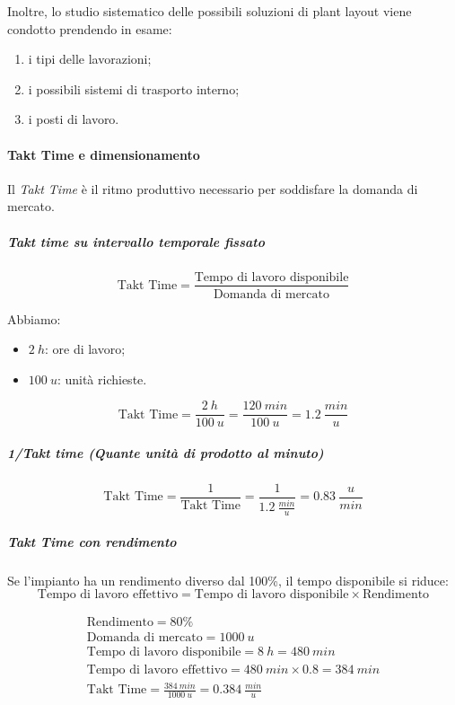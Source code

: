 Inoltre, lo studio sistematico delle possibili soluzioni di plant layout viene condotto prendendo in esame:
\begin{enumerate}
    \item i tipi delle lavorazioni;
    \item i possibili sistemi di trasporto interno;
    \item i posti di lavoro.
\end{enumerate}

%
\paragraph{Takt Time e dimensionamento} Il \emph{Takt Time} è il ritmo produttivo necessario per soddisfare la domanda di mercato.
%
\subparagraph{Takt time su intervallo temporale fissato}
\[
    \text{Takt Time} = \frac{\text{Tempo di lavoro disponibile}}{\text{Domanda di mercato}}
\]
\begin{example}
    Abbiamo:
    \begin{itemize}
        \item $ 2\ h $: ore di lavoro;
        \item $ 100\ u$: unità richieste.
    \end{itemize}
    \[
        \text{Takt Time} = \frac{2\ h}{100\ u} = \frac{120\ min}{100\ u}= 1.2\ \frac{min}{u}
    \]
\end{example}
%
\subparagraph{1/Takt time (Quante unità di prodotto al minuto)}
\[
    \text{Takt Time} = \frac{1}{\text{Takt Time}} = \frac{1}{1.2\ \frac{min}{u}} = 0.83\ \frac{u}{min}
\]

%
\subparagraph{Takt Time con rendimento} Se l'impianto ha un rendimento diverso dal 100\%, il tempo disponibile si riduce:
\[
    \text{Tempo di lavoro effettivo} = \text{Tempo di lavoro disponibile} \times \text{Rendimento}
\]
\begin{example}
    \begin{gather*}
        \text{Rendimento} = 80\% \\
        \text{Domanda di mercato} = 1000\ u \\
        \text{Tempo di lavoro disponibile} = 8\ h = 480\ min \\
        \text{Tempo di lavoro effettivo} = 480\ min \times 0.8 = 384\ min \\
        \text{Takt Time} = \frac{384\ min}{1000\ u} = 0.384\ \frac{min}{u}
    \end{gather*}
\end{example}

